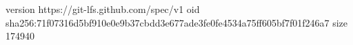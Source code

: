 version https://git-lfs.github.com/spec/v1
oid sha256:71f07316d5bf910e0e9b37cbdd3e677ade3fe0fe4534a75ff605bf7f01f246a7
size 174940
